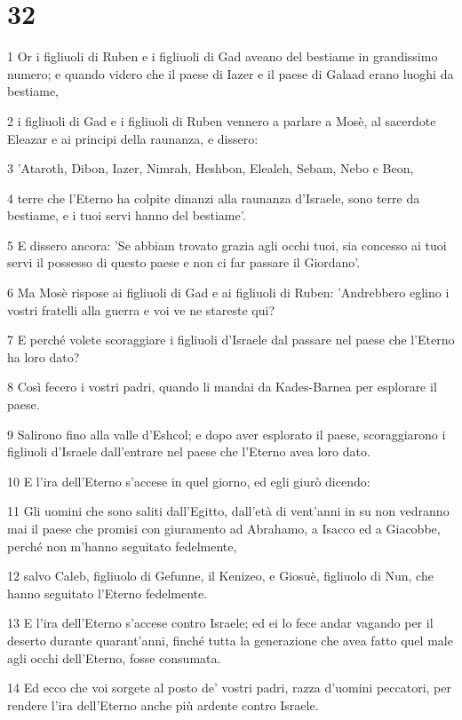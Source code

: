 \chapter{32}

\par 1 Or i figliuoli di Ruben e i figliuoli di Gad aveano del bestiame in grandissimo numero; e quando videro che il paese di Iazer e il paese di Galaad erano luoghi da bestiame,
\par 2 i figliuoli di Gad e i figliuoli di Ruben vennero a parlare a Mosè, al sacerdote Eleazar e ai principi della raunanza, e dissero:
\par 3 'Ataroth, Dibon, Iazer, Nimrah, Heshbon, Elealeh, Sebam, Nebo e Beon,
\par 4 terre che l'Eterno ha colpite dinanzi alla raunanza d'Israele, sono terre da bestiame, e i tuoi servi hanno del bestiame'.
\par 5 E dissero ancora: 'Se abbiam trovato grazia agli occhi tuoi, sia concesso ai tuoi servi il possesso di questo paese e non ci far passare il Giordano'.
\par 6 Ma Mosè rispose ai figliuoli di Gad e ai figliuoli di Ruben: 'Andrebbero eglino i vostri fratelli alla guerra e voi ve ne stareste qui?
\par 7 E perché volete scoraggiare i figliuoli d'Israele dal passare nel paese che l'Eterno ha loro dato?
\par 8 Così fecero i vostri padri, quando li mandai da Kades-Barnea per esplorare il paese.
\par 9 Salirono fino alla valle d'Eshcol; e dopo aver esplorato il paese, scoraggiarono i figliuoli d'Israele dall'entrare nel paese che l'Eterno avea loro dato.
\par 10 E l'ira dell'Eterno s'accese in quel giorno, ed egli giurò dicendo:
\par 11 Gli uomini che sono saliti dall'Egitto, dall'età di vent'anni in su non vedranno mai il paese che promisi con giuramento ad Abrahamo, a Isacco ed a Giacobbe, perché non m'hanno seguitato fedelmente,
\par 12 salvo Caleb, figliuolo di Gefunne, il Kenizeo, e Giosuè, figliuolo di Nun, che hanno seguitato l'Eterno fedelmente.
\par 13 E l'ira dell'Eterno s'accese contro Israele; ed ei lo fece andar vagando per il deserto durante quarant'anni, finché tutta la generazione che avea fatto quel male agli occhi dell'Eterno, fosse consumata.
\par 14 Ed ecco che voi sorgete al posto de' vostri padri, razza d'uomini peccatori, per rendere l'ira dell'Eterno anche più ardente contro Israele.
